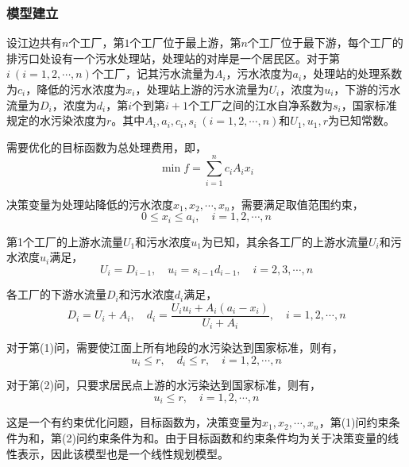 \documentclass[12pt,a4paper]{article}
\begin{document}
\subsubsection{模型建立}

设江边共有$n$个工厂，第$1$个工厂位于最上游，第$n$个工厂位于最下游，每个工厂的排污口处设有一个污水处理站，处理站的对岸是一个居民区。对于第$i\ (i=1,2,\cdots,n)$个工厂，记其污水流量为$A_i$，污水浓度为$a_i$，处理站的处理系数为$c_i$，降低的污水浓度为$x_i$，处理站上游的污水流量为$U_i$，浓度为$u_i$，下游的污水流量为$D_i$，浓度为$d_i$，第$i$个到第$i+1$个工厂之间的江水自净系数为$s_i$，国家标准规定的水污染浓度为$r$。其中$A_i,a_i,c_i,s_i\ (i=1,2,\cdots,n)$和$U_1,u_1,r$为已知常数。

需要优化的目标函数为总处理费用，即，
\begin{equation}\label{eq:ex10_target}
    \min f = \sum_{i=1}^n c_i A_i x_i
\end{equation}

决策变量为处理站降低的污水浓度$x_1, x_2, \cdots, x_n$，需要满足取值范围约束，
\begin{equation}\label{eq:ex10_cons_range}
    0 \le x_i \le a_i, \quad i = 1,2,\cdots,n
\end{equation}

第1个工厂的上游水流量$U_1$和污水浓度$u_1$为已知，其余各工厂的上游水流量$U_i$和污水浓度$u_i$满足，
\begin{equation}
    U_i = D_{i-1}, \quad u_i = s_{i-1} d_{i-1}, \quad i = 2,3,\cdots,n
\end{equation}

各工厂的下游水流量$D_i$和污水浓度$d_i$满足，
\begin{equation}
    D_i = U_i + A_i, \quad d_i = \frac{U_i u_i + A_i (a_i - x_i)}{U_i + A_i}, \quad i = 1,2,\cdots,n
\end{equation}

对于第(1)问，需要使江面上所有地段的水污染达到国家标准，则有，
\begin{equation}\label{eq:ex10_cons_updown}
    u_i \le r, \quad d_i \le r, \quad i =1,2,\cdots,n
\end{equation}

对于第(2)问，只要求居民点上游的水污染达到国家标准，则有，
\begin{equation}\label{eq:ex10_cons_up}
    u_i \le r, \quad i =1,2,\cdots,n
\end{equation}

这是一个有约束优化问题，目标函数为，决策变量为$x_1,x_2,\cdots,x_n$，第(1)问约束条件为和，第(2)问约束条件为和。由于目标函数和约束条件均为关于决策变量的线性表示，因此该模型也是一个线性规划模型。
\end{document}
